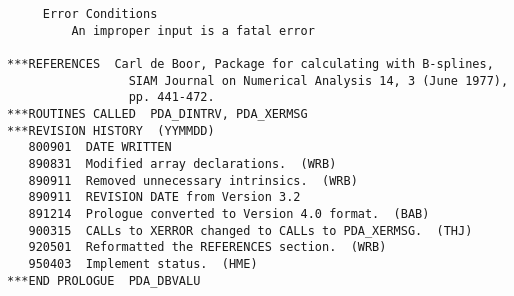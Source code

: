 \begin{verbatim}
     Error Conditions
         An improper input is a fatal error

***REFERENCES  Carl de Boor, Package for calculating with B-splines,
                 SIAM Journal on Numerical Analysis 14, 3 (June 1977),
                 pp. 441-472.
***ROUTINES CALLED  PDA_DINTRV, PDA_XERMSG
***REVISION HISTORY  (YYMMDD)
   800901  DATE WRITTEN
   890831  Modified array declarations.  (WRB)
   890911  Removed unnecessary intrinsics.  (WRB)
   890911  REVISION DATE from Version 3.2
   891214  Prologue converted to Version 4.0 format.  (BAB)
   900315  CALLs to XERROR changed to CALLs to PDA_XERMSG.  (THJ)
   920501  Reformatted the REFERENCES section.  (WRB)
   950403  Implement status.  (HME)
***END PROLOGUE  PDA_DBVALU
\end{verbatim}









